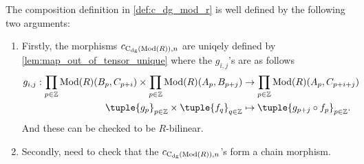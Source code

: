 \begin{remark}
    The composition definition in \autoref{def:c_dg_mod_r} is well defined by the following two arguments:

    \begin{enumerate}
        \item {
            Firstly, the morphisms \( c_{\operatorname{C}_{\operatorname{dg}}(\operatorname{Mod}(R)), n} \) are uniqely defined by \autoref{lem:map_out_of_tensor_unique} where the \( g_{i, j} \)'s are as follows
            \begin{align*}
                g_{i, j}: \prod_{p \in \Zb} \Mod(R)(B_p, C_{p + i}) \times \prod_{p \in \Zb} \Mod(R)(A_p, B_{p + j}) &\to \prod_{p \in \Zb} \Mod(R)(A_p, C_{p + i + j}) \\
                \tuple{ g_p }_{p \in \Zb} \times \tuple{ f_q }_{q \in \Zb} &\mapsto \tuple{ g_{p + j} \circ f_p }_{p \in \Zb}.
            \end{align*}
            And these can be checked to be \( R \)-bilinear.
        }
        \item {
            Secondly, need to check that the \( c_{\operatorname{C}_{\operatorname{dg}}(\operatorname{Mod}(R)), n} \)'s form a chain morphism.

}
\end{enumerate}
\end{remark}
